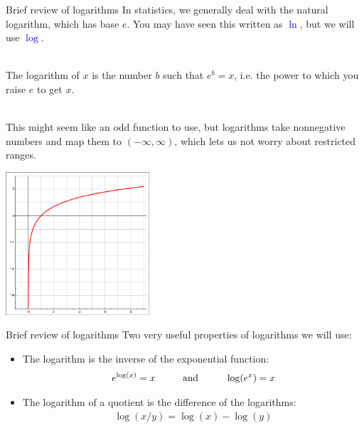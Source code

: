 \documentclass[10pt,t]{beamer}
\newcommand\tab[1][1cm]{\hspace*{#1}}
\begin{document}
\begin{frame}{Brief review of logarithms}
	\vspace{-0.6cm}
	In statistics, we generally deal with the natural logarithm, which has base $e$. You may have seen this written as \textcolor{blue}{$\ln$}, but we will use \textcolor{blue}{$\log$}. 
	\\ ~\
	
	The logarithm of $x$ is the number $b$ such that $e^b = x$, i.e. the power to which you raise $e$ to get $x$. 
	\\ ~\
	
	This might seem like an odd function to use, but logarithms take nonnegative numbers and map them to $(-\infty, \infty)$, which lets us not worry about restricted ranges. 
	
	\begin{center}
		\includegraphics[width=0.4\textwidth]{./figs/log}
	\end{center}
\end{frame}

\begin{frame}{Brief review of logarithms}
	Two very useful properties of logarithms we will use: 
	
	\medskip
	
	\begin{itemize}
		\item The logarithm is the inverse of the exponential function:
		\begin{align*}
			e^{\log(x)} = x \tab \text{and} \tab \log(e^x) = x
		\end{align*}
	\medskip
		\item The logarithm of a quotient is the difference of the logarithms:
		\begin{align*}
			\log(x/y) = \log(x) - \log(y)
		\end{align*}
	\end{itemize}
\end{frame}
\end{document}
